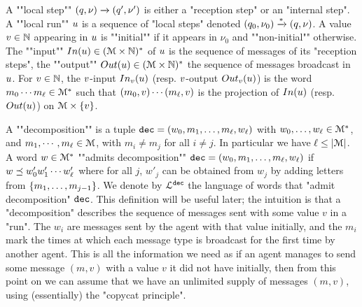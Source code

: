 	\AP A ""local step"" $(q,\nu) \xrightarrow{} (q',\nu')$ is either a "reception step" or an "internal step". 
	\AP A ""local run"" $u$ is a sequence of "local steps" denoted $(q_0, \nu_0) \xrightarrow{*} (q, \nu)$.
	A value $v \in \mathbb{N}$ appearing in $u$ is ""initial"" if it appears in $\nu_0$ and ""non-initial"" otherwise. 
	The ""input"" $\Input{\localrun} \in (\messages \times \nats)^*$ of  $u$ is the sequence of messages of its "reception steps", the ""output"" $\Output{\localrun} \in (\messages \times \nats)^*$ the sequence of messages broadcast in $u$. 
	For $v \in \mathbb{N}$, the $v$-input $\vinput{\aval}{\localrun}$ (resp. $v$-output $\voutput{\aval}{\localrun}$) is the word $m_0 \cdots m_{\ell} \in \mathcal{M}^*$ such that $(m_0, v) \cdots (m_{\ell}, v)$ is the projection of $\Input{\localrun}$ (resp. $\Output{\localrun}$) on $\mathcal{M} \times \{v\}$. 
 
	A ""decomposition"" is a tuple $\mathtt{dec} = (w_0, m_1, \ldots, m_\ell, w_\ell)$ with $w_0, \ldots, w_\ell \in \mathcal{M}^*$, and $m_1, \cdots, m_\ell \in \mathcal{M}$, with $m_i \neq m_j$ for all $i\neq j$. In particular we have $\ell \leq |\mathcal{M}|$. 
	A word $w \in \mathcal{M}^*$ ""admits decomposition"" $\mathtt{dec} = (w_0, m_1, \ldots, m_\ell, w_\ell)$ if $w \preceq w'_0 w'_1 \cdots w'_\ell$ where for all $j$, $w'_j$ can be obtained from $w_j$ by adding letters from $\{m_1, \ldots, m_{j-1}\}$. 
	We denote by $\mathcal{L}^{\mathtt{\mathtt{dec}}}$ the language of words that "admit decomposition" $\mathtt{dec}$. 
	This definition will be useful later; the intuition is that a "decomposition" describes the sequence of messages sent with some value $v$ in a "run". The $w_i$ are messages sent by the agent with that value initially, and the $m_i$ mark the times at which each message type is broadcast for the first time by another agent. This is all the information we need as if an agent manages to send some message $(m,v)$ with a value $v$ it did not have initially, then from this point on we can assume that we have an unlimited supply of messages $(m,v)$, using (essentially) the "copycat principle".  

